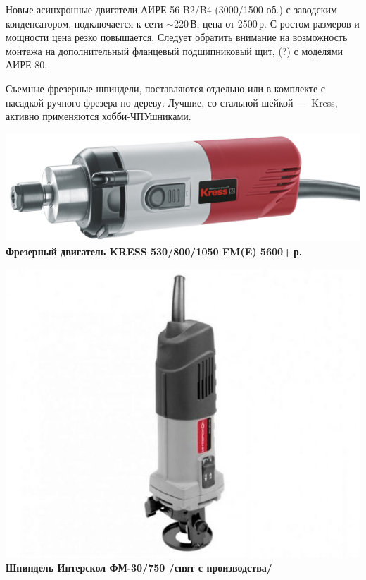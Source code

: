 {\begin{multicols}{2}
\end{multicols}

\bigskip
Новые асинхронные двигатели АИРЕ 56 B2/B4 (3000/1500 об.)
с заводским конденсатором, подключается к сети $\sim$220\,В, цена от 2500\,р.
С ростом размеров и мощности цена резко повышается.
Следует обратить внимание на возможность монтажа на дополнительный фланцевый
подшипниковый щит, (?) с моделями АИРЕ 80.


Съемные фрезерные шпиндели, поставляются отдельно или в комплекте с
насадкой ручного фрезера по дереву. Лучшие, со стальной шейкой\ --- Kress,
активно применяются хобби-ЧПУшниками.

\begin{multicols}{2}

\noindent\href{http://kress-shop.ru/product/frezernyj-dvigatel-530-fm-kress-06082302/}{
\includegraphics[width=\columnwidth]{00/fig/Kress530.jpg}}
\textbf{Фрезерный двигатель KRESS 530/800/1050 FM(E) 5600+\,р.}

\noindent\includegraphics[width=\columnwidth]{00/fig/Interskol30.jpg}
\textbf{Шпиндель Интерскол ФМ-30/750 /снят с производства/}


\end{multicols}}
